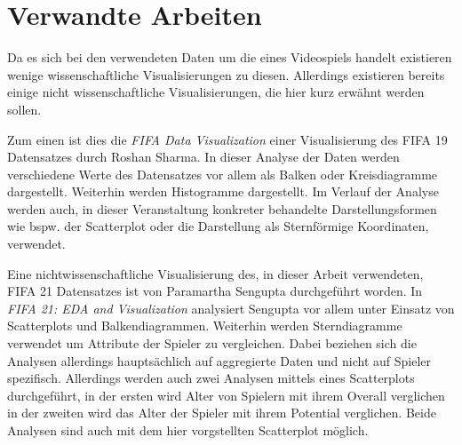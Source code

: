 \documentclass[usegeometry=true]{scrartcl}
\begin{document}
\section{Verwandte Arbeiten}

Da es sich bei den verwendeten Daten um die eines Videospiels handelt existieren wenige wissenschaftliche Visualisierungen zu diesen. Allerdings existieren bereits einige nicht wissenschaftliche Visualisierungen, die hier kurz erwähnt werden sollen.

Zum einen ist dies die \textit{FIFA Data Visualization}\cite{ roshan_fifa_nodate} einer Visualisierung des FIFA 19 Datensatzes durch Roshan Sharma. In dieser Analyse der Daten werden verschiedene Werte des Datensatzes vor allem als Balken oder Kreisdiagramme dargestellt. Weiterhin werden Histogramme dargestellt. Im Verlauf der Analyse werden auch, in dieser Veranstaltung konkreter behandelte Darstellungsformen wie bspw. der Scatterplot oder die Darstellung als Sternförmige Koordinaten, verwendet. 

Eine nichtwissenschaftliche Visualisierung des, in dieser Arbeit verwendeten, FIFA 21 Datensatzes ist von Paramartha Sengupta durchgeführt worden. In \textit{FIFA 21: EDA and Visualization}\cite{sengupta_fifa_nodate} analysiert Sengupta vor allem unter Einsatz von Scatterplots und Balkendiagrammen. Weiterhin werden Sterndiagramme verwendet um Attribute der Spieler zu vergleichen. Dabei beziehen sich die Analysen allerdings hauptsächlich auf aggregierte Daten und nicht auf Spieler spezifisch.
Allerdings werden auch zwei Analysen mittels eines Scatterplots durchgeführt, in der ersten wird Alter von Spielern mit ihrem Overall verglichen in der zweiten wird das Alter der Spieler mit ihrem Potential verglichen. Beide Analysen sind auch mit dem hier vorgstellten Scatterplot möglich.\\
\end{document}
